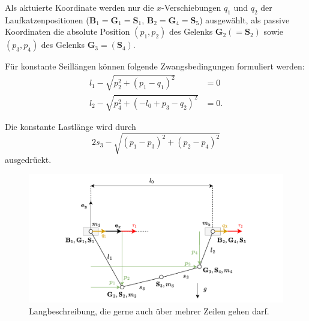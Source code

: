 Als aktuierte Koordinate werden nur die $x$-Verschiebungen $q_1$ und $q_2$ der Laufkatzenpositionen ($\mathbf{B}_1 = \mathbf{G}_1 = \mathbf{S}_1$, $\mathbf{B}_2 = \mathbf{G}_4 = \mathbf{S}_5$) ausgewählt, als passive Koordinaten die absolute Position $(p_1, p_2)$ des Gelenks $\mathbf{G}_2 (= \mathbf{S}_2)$ sowie $(p_3, p_4)$ des Gelenks $\mathbf{G}_3 = (\mathbf{S}_4)$. 

Für konstante Seillängen können folgende Zwangsbedingungen formuliert werden:
\begin{align}
	l_{1} - \sqrt{p_{2}^{2} + \left(p_{1} - q_{1}\right)^{2}} &= 0\\
	l_{2} - \sqrt{p_{4}^{2} + \left(- l_{0} + p_{3} - q_{2}\right)^{2}} &= 0.	
\end{align}

Die konstante Lastlänge wird durch
\begin{equation}
	2 s_{3} - \sqrt{\left(p_{1} - p_{3}\right)^{2} + \left(p_{2} - p_{4}\right)^{2}}
\end{equation}
ausgedrückt.

\begin{figure}[ht]
	\begin{center}
		\includegraphics[scale=1]{Pictures/DAE_double_crane_cartesian_diagram.pdf}
	\end{center}
	\caption[Kurzbeschreibung für Abbildungsverzeichnis]
	{Langbeschreibung, die gerne auch über mehrer Zeilen gehen darf.}
	\label{fig:DAE_double_crane_diagram}
\end{figure}


